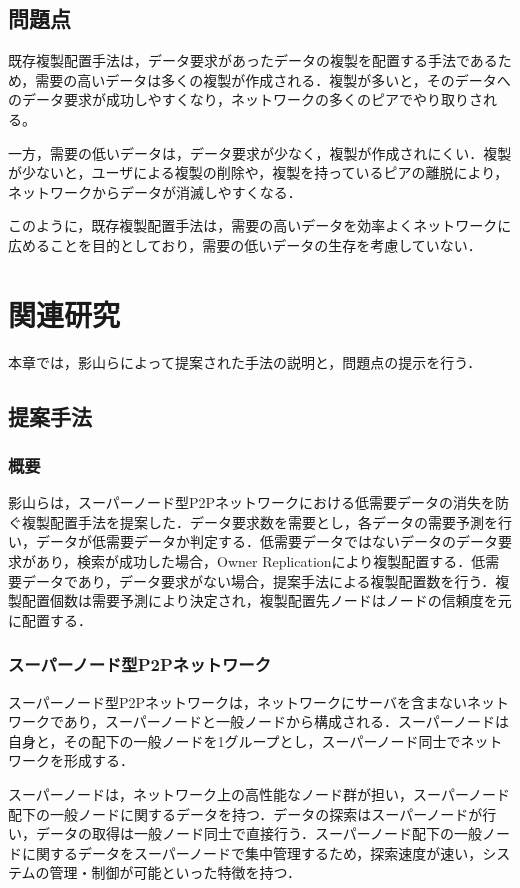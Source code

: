 \documentclass[11pt]{jreport}
\begin{document}
\section{問題点}
既存複製配置手法は，データ要求があったデータの複製を配置する手法であるため，需要の高いデータは多くの複製が作成される．複製が多いと，そのデータへのデータ要求が成功しやすくなり，ネットワークの多くのピアでやり取りされる。
\par 一方，需要の低いデータは，データ要求が少なく，複製が作成されにくい．複製が少ないと，ユーザによる複製の削除や，複製を持っているピアの離脱により，ネットワークからデータが消滅しやすくなる．
\par このように，既存複製配置手法は，需要の高いデータを効率よくネットワークに広めることを目的としており，需要の低いデータの生存を考慮していない．



\chapter{関連研究}
本章では，影山ら\cite{kageyama}によって提案された手法の説明と，問題点の提示を行う．

\section{提案手法}

\subsection{概要}
影山らは，スーパーノード型P2Pネットワークにおける低需要データの消失を防ぐ複製配置手法を提案した．データ要求数を需要とし，各データの需要予測を行い，データが低需要データか判定する．低需要データではないデータのデータ要求があり，検索が成功した場合，Owner Replicationにより複製配置する．低需要データであり，データ要求がない場合，提案手法による複製配置数を行う．複製配置個数は需要予測により決定され，複製配置先ノードはノードの信頼度を元に配置する．

\subsection{スーパーノード型P2Pネットワーク}
スーパーノード型P2Pネットワークは，ネットワークにサーバを含まないネットワークであり，スーパーノードと一般ノードから構成される．スーパーノードは自身と，その配下の一般ノードを1グループとし，スーパーノード同士でネットワークを形成する．
\par スーパーノードは，ネットワーク上の高性能なノード群が担い，スーパーノード配下の一般ノードに関するデータを持つ．データの探索はスーパーノードが行い，データの取得は一般ノード同士で直接行う．スーパーノード配下の一般ノードに関するデータをスーパーノードで集中管理するため，探索速度が速い，システムの管理・制御が可能といった特徴を持つ．
\end{document}
